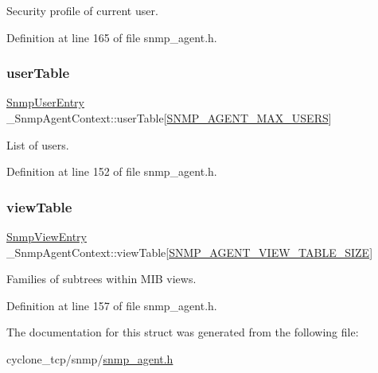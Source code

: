 Security profile of current user. 



Definition at line 165 of file snmp\+\_\+agent.\+h.

\mbox{\label{struct__SnmpAgentContext_a6c1f41a6c7fa82b33ab73b31197e2036}} 
\subsubsection{\texorpdfstring{user\+Table}{userTable}}
{\footnotesize\ttfamily \hyperlink{structSnmpUserEntry}{Snmp\+User\+Entry} \+\_\+\+Snmp\+Agent\+Context\+::user\+Table\mbox{[}\hyperlink{snmp__agent_8h_a87620bd88babef997647226c78f35ecb}{S\+N\+M\+P\+\_\+\+A\+G\+E\+N\+T\+\_\+\+M\+A\+X\+\_\+\+U\+S\+E\+RS}\mbox{]}}



List of users. 



Definition at line 152 of file snmp\+\_\+agent.\+h.

\mbox{\label{struct__SnmpAgentContext_aefb028a572eb6cf2493543805dc75cb6}} 
\subsubsection{\texorpdfstring{view\+Table}{viewTable}}
{\footnotesize\ttfamily \hyperlink{structSnmpViewEntry}{Snmp\+View\+Entry} \+\_\+\+Snmp\+Agent\+Context\+::view\+Table\mbox{[}\hyperlink{snmp__agent_8h_a3bd40db59e400b8c4000a718a6da88e1}{S\+N\+M\+P\+\_\+\+A\+G\+E\+N\+T\+\_\+\+V\+I\+E\+W\+\_\+\+T\+A\+B\+L\+E\+\_\+\+S\+I\+ZE}\mbox{]}}



Families of subtrees within M\+IB views. 



Definition at line 157 of file snmp\+\_\+agent.\+h.



The documentation for this struct was generated from the following file\+:\begin{DoxyCompactItemize}
\item 
cyclone\+\_\+tcp/snmp/\hyperlink{snmp__agent_8h}{snmp\+\_\+agent.\+h}\end{DoxyCompactItemize}
